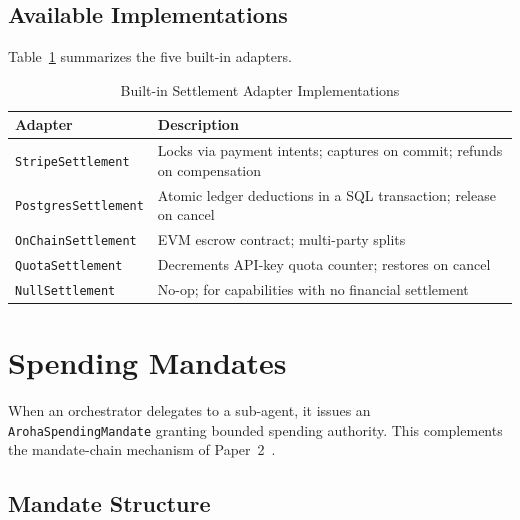 \documentclass[conference]{IEEEtran}
\begin{document}
\subsection{Available Implementations}

Table~\ref{tab:settlement} summarizes the five built-in adapters.

\begin{table}[t]
\centering
\caption{Built-in Settlement Adapter Implementations}
\label{tab:settlement}
{\small
\begin{tabular}{@{}lp{4.5cm}@{}}
\toprule
\textbf{Adapter} & \textbf{Description} \\
\midrule
\texttt{StripeSettlement}    & Locks via payment intents; captures
                               on commit; refunds on compensation \\
\texttt{PostgresSettlement}  & Atomic ledger deductions in a SQL
                               transaction; release on cancel \\
\texttt{OnChainSettlement}   & EVM escrow contract; multi-party splits \\
\texttt{QuotaSettlement}     & Decrements API-key quota counter;
                               restores on cancel \\
\texttt{NullSettlement}      & No-op; for capabilities with no
                               financial settlement \\
\bottomrule
\end{tabular}
}
\end{table}

\section{Spending Mandates}
\label{sec:mandates}

When an orchestrator delegates to a sub-agent, it issues an
\texttt{ArohaSpendingMandate} granting bounded spending authority.
This complements the mandate-chain mechanism of Paper~2~\cite{aroha2025p2}.

\subsection{Mandate Structure}
\end{document}
